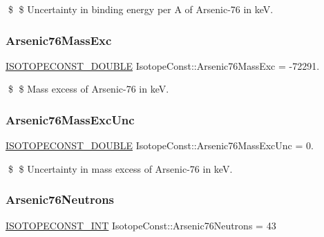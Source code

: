 \$ \$ Uncertainty in binding energy per A of Arsenic-\/76 in keV. \mbox{\label{group___isotope_const-_arsenic-_as76_gae95a7a419182faca9a6590e26e76d35d}} 
\subsubsection{\texorpdfstring{Arsenic76\+Mass\+Exc}{Arsenic76MassExc}}
{\footnotesize\ttfamily \mbox{\hyperlink{group___isotope_const-_macros_ga8f45a7272ce02c0b4c65c44636ed719a}{I\+S\+O\+T\+O\+P\+E\+C\+O\+N\+S\+T\+\_\+\+D\+O\+U\+B\+LE}} Isotope\+Const\+::\+Arsenic76\+Mass\+Exc = -\/72291.}

\$ \$ Mass excess of Arsenic-\/76 in keV. \mbox{\label{group___isotope_const-_arsenic-_as76_ga60a16e214fdaf0a4b78cf9e9a438e64b}} 
\subsubsection{\texorpdfstring{Arsenic76\+Mass\+Exc\+Unc}{Arsenic76MassExcUnc}}
{\footnotesize\ttfamily \mbox{\hyperlink{group___isotope_const-_macros_ga8f45a7272ce02c0b4c65c44636ed719a}{I\+S\+O\+T\+O\+P\+E\+C\+O\+N\+S\+T\+\_\+\+D\+O\+U\+B\+LE}} Isotope\+Const\+::\+Arsenic76\+Mass\+Exc\+Unc = 0.}

\$ \$ Uncertainty in mass excess of Arsenic-\/76 in keV. \mbox{\label{group___isotope_const-_arsenic-_as76_gaa645525778e75fa74c793bab3a85589e}} 
\subsubsection{\texorpdfstring{Arsenic76\+Neutrons}{Arsenic76Neutrons}}
{\footnotesize\ttfamily \mbox{\hyperlink{group___isotope_const-_macros_ga5f18360b3e99483a35c32d789e62621c}{I\+S\+O\+T\+O\+P\+E\+C\+O\+N\+S\+T\+\_\+\+I\+NT}} Isotope\+Const\+::\+Arsenic76\+Neutrons = 43}

